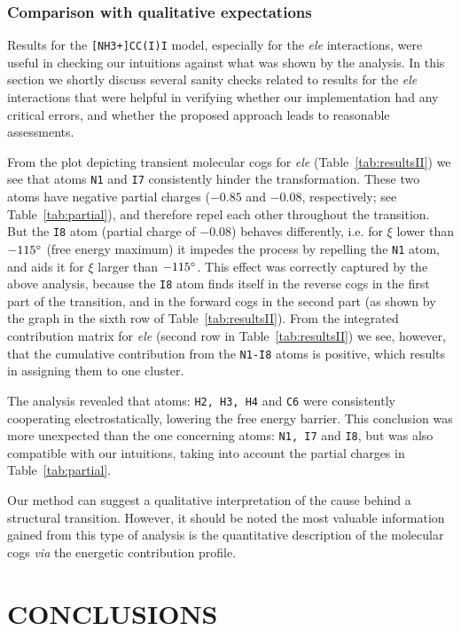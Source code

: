 {\color{black}
\subsubsection*{Comparison with qualitative expectations}
Results for the \texttt{[NH3+]CC(I)I} model, especially for the \emph{ele} interactions, were useful in checking our intuitions against what was shown by the analysis.
In this section we shortly discuss several sanity checks related to results for the \emph{ele} interactions that were helpful in verifying whether our implementation had any critical errors, and whether the proposed approach leads to reasonable assessments.

From the plot depicting transient molecular cogs for \emph{ele} (Table~\ref{tab:resultsII}) we see that atoms \texttt{N1} and \texttt{I7} consistently hinder the transformation.
These two atoms have negative partial charges ($-0.85$ and $-0.08$, respectively; see Table~\ref{tab:partial}), and therefore repel each other throughout the transition.
But the \texttt{I8} atom (partial charge of $-0.08$) behaves differently, i.e. for $\xi$ lower than $-115\degree$ (free energy maximum) it impedes the process by repelling the \texttt{N1} atom, and aids it for $\xi$ larger than $-115\degree$.
This effect was correctly captured by the above analysis, because the \texttt{I8} atom finds itself in the reverse cogs in the first part of the transition, and in the forward cogs in the second part (as shown by the graph in the sixth row of Table~\ref{tab:resultsII}).
From the integrated contribution matrix for \emph{ele} (second row in Table~\ref{tab:resultsII}) we see, however, that the cumulative contribution from the \texttt{N1-I8} atoms is positive, which results in assigning them to one cluster.

The analysis revealed that atoms: \texttt{H2, H3, H4} and \texttt{C6} were consistently cooperating electrostatically, lowering the free energy barrier.
This conclusion was more unexpected than the one concerning atoms: \texttt{N1, I7} and \texttt{I8}, but was also compatible with our intuitions, taking into account the partial charges in Table~\ref{tab:partial}.

Our method can suggest a qualitative interpretation of the cause behind a structural transition.
However, it should be noted the most valuable information gained from this type of analysis is the quantitative description of the molecular cogs \emph{via} the energetic contribution profile.
}

\section*{\sffamily \Large CONCLUSIONS}

